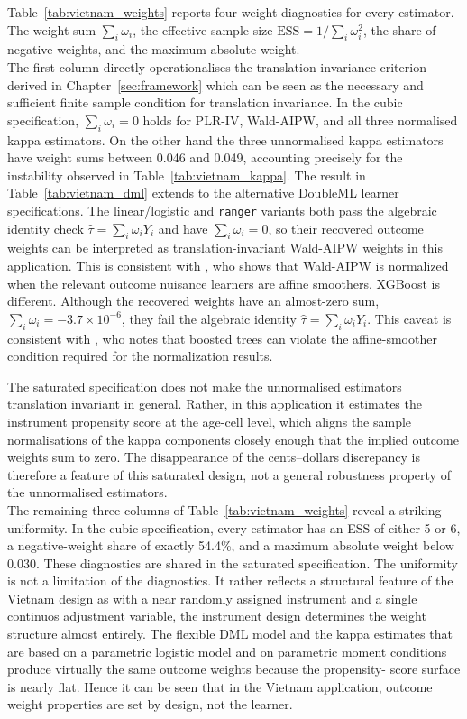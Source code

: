 \documentclass[12pt, a4paper, oneside]{article}
\theoremstyle{plain}
\theoremstyle{definition}
\begin{document}
Table~\ref{tab:vietnam_weights} reports four weight diagnostics for every
estimator. The weight sum $\sum_i \omega_i$, the effective sample size
$\text{ESS} = 1/\sum_i \omega_i^2$, the share of negative weights, and the
maximum absolute weight. \\
The first column directly operationalises the
translation-invariance criterion derived in Chapter~\ref{sec:framework} which can be seen as the necessary and sufficient finite sample condition for translation invariance.
In the cubic specification, $\sum_i\omega_i = 0$ holds 
for PLR-IV, Wald-AIPW, and all three normalised kappa estimators.
On the other hand the three
unnormalised kappa estimators have weight sums between 0.046 and 0.049,
accounting precisely for the instability observed in Table~\ref{tab:vietnam_kappa}.
 The result in Table~\ref{tab:vietnam_dml} extends to the alternative
DoubleML learner specifications. The linear/logistic and \texttt{ranger}
variants both pass the algebraic identity check
\(\hat\tau=\sum_i\omega_iY_i\) and have \(\sum_i\omega_i=0\), so their
recovered outcome weights can be interpreted as translation-invariant
Wald-AIPW weights in this application. This is consistent with
\citet{knaus2024treatment}, who shows that Wald-AIPW is normalized when
the relevant outcome nuisance learners are affine smoothers.
XGBoost is different. Although the recovered weights have an almost-zero
sum, \(\sum_i\omega_i=-3.7\times10^{-6}\), they fail the algebraic identity
\(\hat\tau=\sum_i\omega_iY_i\).
This caveat is consistent with
\citet{knaus2024treatment}, who notes that boosted trees can violate the
affine-smoother condition required for the normalization results.


The saturated specification does not make the unnormalised estimators translation invariant in general. Rather, in this application it estimates the instrument propensity score at the age-cell level, which aligns the sample normalisations of the kappa components closely enough that the implied outcome weights sum to zero. The disappearance of the cents--dollars discrepancy is therefore a feature of this saturated design, not a general robustness property of the unnormalised estimators.\\
The remaining three columns of Table~\ref{tab:vietnam_weights} reveal a
striking uniformity. In the cubic specification, every estimator has an ESS
of either 5 or 6, a negative-weight share of exactly 54.4\%, and a maximum
absolute weight below 0.030. These diagnostics are shared in the saturated specification.
The uniformity is not a limitation of the diagnostics. It rather reflects a structural feature of the Vietnam design as with a near randomly assigned instrument and a single continuos adjustment variable, the instrument design determines the weight structure almost entirely. 
The flexible
DML model and the kappa estimates that are based on a parametric logistic model and on parametric moment conditions produce virtually the same outcome weights because the propensity-
score surface is nearly flat.
Hence it can be seen that in the Vietnam application, outcome weight properties are set by design, not the learner.
\end{document}
